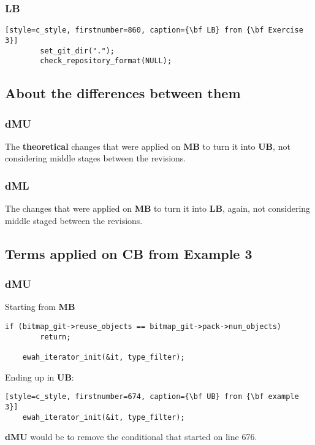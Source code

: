 \subsubsection*{LB}
\begin{lstlisting}[style=c_style, firstnumber=860, caption={\bf LB} from {\bf Exercise 3}]
		set_git_dir(".");
		check_repository_format(NULL);
\end{lstlisting}

\subsection{About the differences between them}
\subsubsection{dMU}
The {\bf theoretical} changes that were applied on {\bf MB} to turn it into {\bf UB}, not considering
middle stages between the revisions.

\subsubsection{dML}
The changes that were applied on {\bf MB} to turn it into {\bf LB}, again, not considering
middle staged between the revisions.

\subsection{Terms applied on CB from Example 3}
\subsubsection{dMU}
Starting from {\bf MB}
\begin{lstlisting}[style=c_style, firstnumber=676, caption=One {\bf MB} from {\bf example 3}]
	if (bitmap_git->reuse_objects == bitmap_git->pack->num_objects)
		return;

	ewah_iterator_init(&it, type_filter);
\end{lstlisting}
Ending up in {\bf UB}:
\begin{lstlisting}[style=c_style, firstnumber=674, caption={\bf UB} from {\bf example 3}]
	ewah_iterator_init(&it, type_filter);
\end{lstlisting}

{\bf dMU} would be to remove the conditional that started on line 676.

